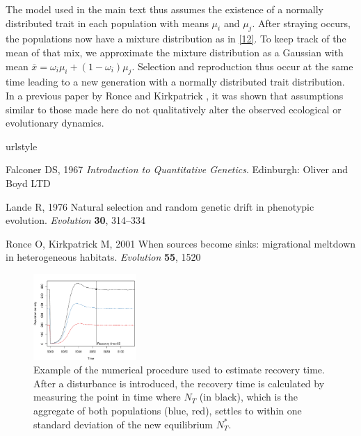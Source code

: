 \documentclass{revtex4}
\begin{document}
The model used in the main text thus assumes the existence of a normally distributed trait in each population with means $\mu_{i}$ and $\mu_{j}$. 
After straying occurs, the populations now have a mixture distribution as in \ref{12}. 
To keep track of the mean of that mix, we approximate the mixture distribution as a Gaussian with mean $\overline{x}=\omega_i \mu_{i}+(1-\omega_i)\mu_{j}$. 
Selection and reproduction thus occur at the same time leading to a new generation with a normally distributed trait distribution.
In a previous paper by Ronce and Kirkpatrick \citep{Ronce:2001dp}, it was shown that assumptions similar to those made here do not qualitatively alter the observed ecological or evolutionary dynamics.
 


% 

\begin{thebibliography}{1}
\expandafter\ifx\csname urlstyle\endcsname\relax
  \providecommand{\doi}[1]{doi:\discretionary{}{}{}#1}\else
  \providecommand{\doi}{doi:\discretionary{}{}{}\begingroup
  \urlstyle{rm}\Url}\fi

Falconer DS, 1967 \emph{{Introduction to Quantitative Genetics}}.
\newblock Edinburgh: Oliver and Boyd LTD

Lande R, 1976 {Natural selection and random genetic drift in phenotypic
  evolution}.
\newblock \emph{Evolution} \textbf{30}, 314--334

Ronce O, Kirkpatrick M, 2001 {When sources become sinks: migrational meltdown
  in heterogeneous habitats}.
\newblock \emph{Evolution} \textbf{55}, 1520

\end{thebibliography}


\clearpage

\begin{figure}
  \captionsetup{justification=raggedright,
singlelinecheck=false
}
\centering
\includegraphics[width=0.35\textwidth]{fig_recovery.pdf}
\caption{
Example of the numerical procedure used to estimate recovery time. After a disturbance is introduced, the recovery time is calculated by measuring the point in time where $N_T$ (in black), which is the aggregate of both populations (blue, red), settles to within one standard deviation of the new equilibrium $N_T^*$. 
} \label{fig:recovery}
\end{figure}
\end{document}
